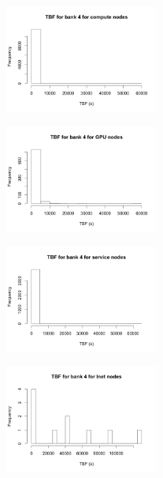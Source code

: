 \begin{figure}
\centering
\includegraphics[width=0.45\textwidth]{images/tbf_4_c.png}
\end{figure}

\begin{figure}
\centering
\includegraphics[width=0.45\textwidth]{images/tbf_4_g.png}
\end{figure}

\begin{figure}
\centering
\includegraphics[width=0.45\textwidth]{images/tbf_4_s.png}
\end{figure}

\begin{figure}
\centering
\includegraphics[width=0.45\textwidth]{images/tbf_4_l.png}
\end{figure}

